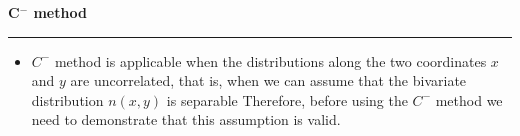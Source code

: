 \documentclass[letterpaper,landscape]{slides}
\begin{document}
\begin{slide}
\begin{center}
\bfseries
{\large {\color{red} C$^-$ method}}
\end{center}
\vskip 0.2in
\hrule

\begin{itemize}
\item
$C^-$ method is applicable when the distributions along the two coordinates $x$ and $y$ 
are uncorrelated, that is, when we can assume that the bivariate distribution $n(x,y)$ is separable
Therefore, before using the $C^-$ method we need to demonstrate that this
assumption is valid. 
\end{itemize}

\vskip -0.7in
\phantom{x}

\vfill
\end{slide}
 
\end{document}
